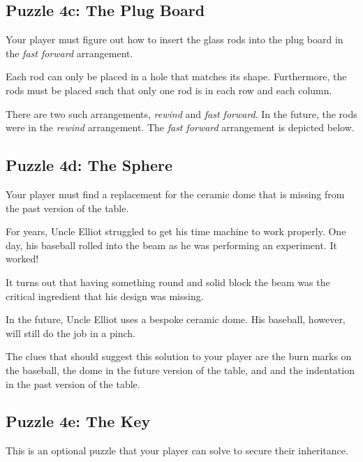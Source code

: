 \documentclass[a6paper, parskip=half, DIV=14, 12pt]{scrartcl}
\begin{document}
\newpage

\subsection*{Puzzle 4c: The Plug Board}
Your player must figure out how to insert the glass rods into the plug board in the \emph{fast forward} arrangement.

Each rod can only be placed in a hole that matches its shape.
Furthermore, the rods must be placed such that only one rod is in each row and each column.

There are two such arrangements, \emph{rewind} and \emph{fast forward}.
In the future, the rods were in the \emph{rewind} arrangement.
The \emph{fast forward} arrangement is depicted below.

\begin{center}
\end{center}

\newpage

\subsection*{Puzzle 4d: The Sphere}
Your player must find a replacement for the ceramic dome that is missing from the past version of the table.

For years, Uncle Elliot struggled to get his time machine to work properly. One day, his baseball rolled into the beam as he was performing an experiment. It worked!

It turns out that having something round and solid block the beam was the critical ingredient that his design was missing.

In the future, Uncle Elliot uses a bespoke ceramic dome. His baseball, however, will still do the job in a pinch.

The clues that should suggest this solution to your player are the burn marks on the baseball, the dome in the future version of the table, and and the indentation in the past version of the table. 
 
\newpage

\subsection*{Puzzle 4e: The Key}
This is an optional puzzle that your player can solve to secure their inheritance.
\end{document}
